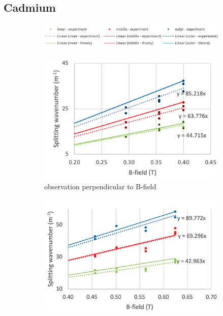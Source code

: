\documentclass[11pt]{article}
\begin{document}
\subsection{Cadmium}
\begin{figure}[h!]
    \centering
        \begin{subfigure}{\linewidth}
        \includegraphics[width=\linewidth]{splitting graphs/legend.png}
    \end{subfigure}
    \begin{subfigure}{0.47\linewidth}
        \includegraphics[width=\linewidth]{splitting graphs/Cd green sigma perp gr.png}
        \caption{observation perpendicular to B-field}
        \label{fig: Cd green sig perp}
    \end{subfigure}
    \begin{subfigure}{0.47\linewidth}
        \includegraphics[width=\linewidth]{splitting graphs/Cd green sigma par gr.png}

\end{subfigure}
\end{figure}
\end{document}
